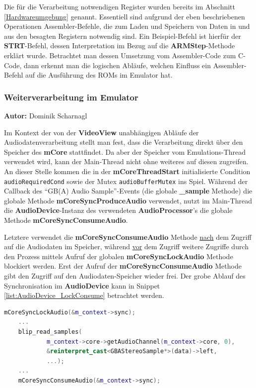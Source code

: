 \documentclass[11pt,a4paper]{scrartcl}
\newcommand{\AutorDominik} {
    \vspace{-4mm}
    \large \textbf{Autor:} Dominik Scharnagl \normalsize
    \vspace{2mm}
}
\begin{document}
Die f\"ur die Verarbeitung notwendigen Register wurden bereits im Abschnitt \ref{Hardwareumgebung} genannt. Essentiell sind aufgrund der eben beschriebenen Operationen Assembler-Befehle, die zum Laden und Speichern von Daten in und aus den besagten Registern notwendig sind. Ein Beispiel-Befehl ist hierf\"ur der \textbf{STRT}-Befehl, dessen Interpretation im Bezug auf die \textbf{ARMStep}-Methode erkl\"art wurde. Betrachtet man dessen Umsetzung vom Assembler-Code zum C-Code, dann erkennt man die logischen Abl\"aufe, welchen Einfluss ein Assembler-Befehl auf die Ausf\"uhrung des ROMs im Emulator hat.



\subsubsection{Weiterverarbeitung im Emulator}
\AutorDominik

Im Kontext der von der \textbf{VideoView} unabh\"angigen Abl\"aufe der Audiodatenverarbeitung stellt man fest, dass die Verarbeitung direkt \"uber den Speicher des \textbf{mCore} stattfindet. Da aber der Speicher vom Emulations-Thread verwendet wird, kann der Main-Thread nicht ohne weiteres auf diesen zugreifen. An dieser Stelle kommen die in der \textbf{mCoreThreadStart} initialisierte Condition \verb|audioRequiredCond| sowie der Mutex \verb|audioBufferMutex| ins Spiel. W\"ahrend der Callback des \enquote{GB(A) Audio Sample}-Events (die globale \textbf{{\_}sample} Methode) die globale Methode \textbf{mCoreSyncProduceAudio} verwendet, nutzt im Main-Thread die \textbf{AudioDevice}-Instanz des verwendeten \textbf{AudioProcessor}'s die globale Methode \textbf{mCoreSyncConsumeAudio}.

Letztere verwendet die \textbf{mCoreSyncConsumeAudio} Methode \underline{nach} dem Zugriff auf die Audiodaten im Speicher, w\"ahrend \underline{vor} dem Zugriff weitere Zugriffe durch den Prozess mittels Aufruf der globalen \textbf{mCoreSyncLockAudio} Methode blockiert werden. Erst der Aufruf der \textbf{mCoreSyncConsumeAudio} Methode gibt den Zugriff auf den Audiodaten-Speicher wieder frei. Der grobe Ablauf des Synchronisation im \textbf{AudioDevice} kann in Snippet \ref{list:AudioDevice_LockConsume} betrachtet werden.

\vspace{5mm}
\begin{lstlisting}[language=C++, caption={AudioDevice - \enquote{Lock / Consume}}, label={list:AudioDevice_LockConsume}]
	mCoreSyncLockAudio(&m_context->sync);
	...
	blip_read_samples(
            m_context->core->getAudioChannel(m_context->core, 0),
            &reinterpret_cast<GBAStereoSample*>(data)->left,
            ...);
    ...
    mCoreSyncConsumeAudio(&m_context->sync);
\end{lstlisting}
\end{document}
